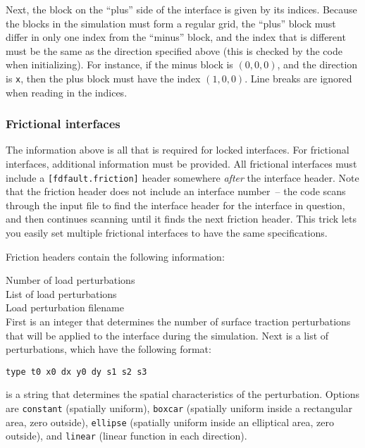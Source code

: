 \documentclass[12pt]{article}   	%
\begin{document}
Next, the block on the ``plus'' side of the interface is given by its indices. Because the blocks in the simulation must form a regular grid, the ``plus'' block must differ in only one index from the ``minus'' block, and the index that is different must be the same as the direction specified above (this is checked by the code when initializing). For instance, if the minus block is $(0,0,0)$, and the direction is {\tt x}, then the plus block must have the index $(1,0,0)$. Line breaks are ignored when reading in the indices.

\subsubsection{Frictional interfaces}

The information above is all that is required for locked interfaces. For frictional interfaces, additional information must be provided. All frictional interfaces must include a {\tt [fdfault.friction]} header somewhere {\em after} the interface header. Note that the friction header does not include an interface number~-- the code scans through the input file to find the interface header for the interface in question, and then continues scanning until it finds the next friction header. This trick lets you easily set multiple frictional interfaces to have the same specifications.

Friction headers contain the following information:

\vspace{0.1in}
\indent Number of load perturbations \\
\indent List of load perturbations \\
\indent Load perturbation filename \\

\vspace{0.1in}
\noindent First is an integer that determines the number of surface traction perturbations that will be applied to the interface during the simulation. Next is a list of perturbations, which have the following format:

\vspace{0.1in}
{\tt type t0 x0 dx y0 dy s1 s2 s3}

\vspace{0.1in}
 is a string that determines the spatial characteristics of the perturbation. Options are {\tt constant} (spatially uniform), {\tt boxcar} (spatially uniform inside a rectangular area, zero outside), {\tt ellipse} (spatially uniform inside an elliptical area, zero outside), and {\tt linear} (linear function in each direction).
\end{document}
